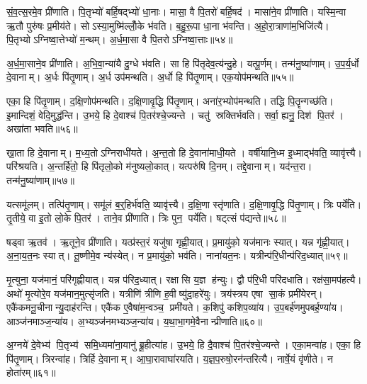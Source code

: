 सं॒व॒त्स॒रमे॒व प्री॑णाति।
पि॒तृभ्यो॑ बर्\mbox{}हि॒षद्भ्यो॑ धा॒नाः।
मासा॒ वै पि॒तरो॑ बर्\mbox{}हि॒षद॑।
मासा॑ने॒व प्री॑णाति।
यस्मि॒न्वा ऋ॒तौ पुरु॑षः प्र॒मीय॑ते।
सोऽस्या॒मुष्मि॑ल्लोँ॒के भ॑वति।
ब॒हु॒रू॒पा धा॒ना भ॑वन्ति।
अ॒हो॒रा॒त्राणा॑म॒भिजि॑त्यै।
पि॒तृभ्योऽग्निष्वा॒त्तेभ्यो॑ म॒न्थम्।
अ॒र्ध॒मा॒सा वै पि॒तरोऽग्निष्वा॒त्ताः॥५४॥

अ॒र्ध॒मा॒साने॒व प्री॑णाति।
अ॒भि॒वा॒न्या॑यै दु॒ग्धे भ॑वति।
सा हि पि॑तृदेव॒त्य॑न्दु॒हे।
यत्पू॒र्णम्।
तन्म॑नु॒ष्या॑णाम्।
उ॒प॒र्य॒र्धो दे॒वानाम्।
अ॒र्धः पि॑तृ॒णाम्।
अ॒र्ध उप॑मन्थति।
अ॒र्धो हि पि॑तृ॒णाम्।
एक॒योप॑मन्थति॥५५॥

एका॒ हि पि॑तृ॒णाम्।
द॒क्षि॒णोप॑मन्थति।
द॒क्षि॒णावृ॒द्धि पि॑तृ॒णाम्।
अना॑र॒भ्योप॑मन्थति।
तद्धि पि॒तॄन्गच्छ॑ति।
इ॒मान्दिशं॒ वेदि॒मुद्ध॑न्ति।
उ॒भये॒ हि दे॒वाश्च॑ पि॒तर॑श्चे॒ज्यन्ते।
चतु॑ स्रक्तिर्भवति।
सर्वा॒ ह्यनु॒ दिश॑ पि॒तर॑।
अखा॑ता भवति॥५६॥

खा॒ता हि दे॒वानाम्।
म॒ध्य॒तोऽग्निराधी॑यते।
अ॒न्त॒तो हि दे॒वाना॑माधी॒यते।
वर्\mbox{}षी॑यानि॒ध्म इ॒ध्माद्भ॑वति॒ व्यावृ॑त्त्यै।
परि॑श्रयति।
अ॒न्तर्\mbox{}हि॑तो॒ हि पि॑तृलो॒को म॑नुष्यलो॒कात्।
यत्परु॑षि दि॒नम्।
तद्दे॒वानाम्।
यद॑न्त॒रा।
तन्म॑नु॒ष्या॑णाम्॥५७॥

यत्समू॑लम्।
तत्पि॑तृ॒णाम्।
समू॑लं ब॒र्॒हिर्भ॑वति॒ व्यावृ॑त्त्यै।
द॒क्षि॒णा स्तृ॑णाति।
द॒क्षि॒णावृ॒द्धि पि॑तृ॒णाम्।
त्रिः पर्ये॑ति।
तृ॒तीये॒ वा इ॒तो लो॒के पि॒तर॑।
ताने॒व प्री॑णाति।
त्रिः पुन॒ पर्ये॑ति।
षट्त्सं प॑द्यन्ते॥५८॥

षड्वा ऋ॒तव॑।
ऋ॒तूने॒व प्री॑णाति।
यत्प्र॑स्त॒रं यजु॑षा गृह्णी॒यात्।
प्र॒मायु॑को॒ यज॑मानः स्यात्।
यन्न गृ॑ह्णी॒यात्।
अ॒ना॒य॒त॒नः स्यात्।
तू॒ष्णीमे॒व न्य॑स्येत्।
न प्र॒मायु॑को॒ भव॑ति।
नाना॑यत॒नः।
यत्रीन्प॑रि॒धीन्प॑रिद॒ध्यात्॥५९॥

मृ॒त्युना॒ यज॑मानं॒ परि॑गृह्णीयात्।
यन्न प॑रिद॒ध्यात्।
रक्षासि य॒ज्ञ ह॑न्युः।
द्वौ प॑रि॒धी परि॑दधाति।
रक्ष॑सा॒मप॑हत्यै।
अथो॑ मृ॒त्योरे॒व यज॑मान॒मुत्सृ॑जति।
यत्रीणि॑ त्रीणि ह॒वीष्यु॑दा॒हरे॑युः।
त्रय॑स्त्रय एषा सा॒कं प्रमी॑येरन्।
एकै॑कमनू॒चीनान्यु॒दाह॑रन्ति।
एकै॑क ए॒वैषा॑म॒न्वञ्च॒ प्रमी॑यते।
क॒शिपु॑ कशिप॒व्या॑य।
उ॒प॒बर्\mbox{}ह॑णमुपबर्\mbox{}ह॒ण्या॑य।
आञ्ज॑नमाञ्ज॒न्या॑य।
अ॒भ्यञ्ज॑नमभ्यञ्ज॒न्या॑य।
य॒था॒भा॒गमे॒वैनान्प्रीणाति॥६०॥

अ॒ग्नये॑ दे॒वेभ्य॑ पि॒तृभ्य॑ समि॒ध्यमा॑ना॒यानु॑ ब्रू॒हीत्या॑ह।
उ॒भये॒ हि दै॒वाश्च॑ पि॒तर॑श्चे॒ज्यन्ते।
एका॒मन्वा॑ह।
एका॒ हि पि॑तृ॒णाम्।
त्रिरन्वा॑ह।
त्रिर्\mbox{}हि दे॒वानाम्।
आ॒घा॒रावाघा॑रयति।
य॒ज्ञ॒प॒रुषो॒रन॑न्तरित्यै।
नार्\mbox{}षे॒यं वृ॑णीते।
न होता॑रम्॥६१॥

